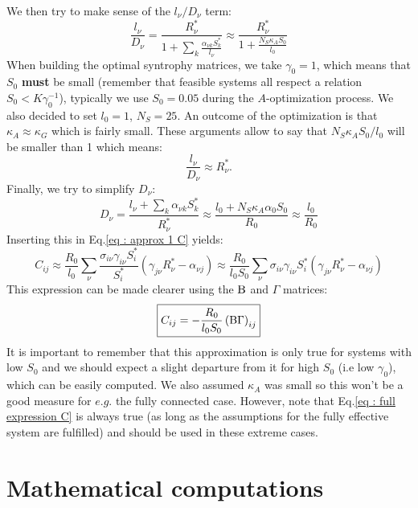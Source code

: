 \documentclass[12pt, titlepage, twoside, openright]{report}
\begin{document}
  We then try to make sense of the $l_\nu / D_\nu $ term:
  \begin{equation}
  \frac{l_\nu}{D_\nu} = \frac{R^*_\nu}{1+\sum_k \frac{\alpha_{\nu k}S^*_k}{l_\nu}} \approx \frac{R^*_\nu}{1+\frac{N_S \kappa_A S_0}{l_0}}
  \end{equation}
  When building the optimal syntrophy matrices, we take $\gamma_0=1$, which means that $S_0$ \textbf{must} be small (remember that feasible systems all respect a relation $S_0 < K \gamma_0^{-1}$), typically we use $S_0 = 0.05$ during the $A$-optimization process. We also decided to set $l_0 = 1$, $N_S=25$. An outcome of the  optimization is that $\kappa_A \approx \kappa_G$ which is fairly small. These arguments allow to say that $N_S \kappa_A S_0/l_0$ will be smaller than 1 which means:
  \begin{equation}
  \frac{l_\nu}{D_\nu} \approx R^*_\nu.
  \end{equation}
  Finally, we try to simplify $D_\nu$:
  \begin{equation}
  D_\nu = \frac{l_\nu + \sum_k \alpha_{\nu k}S^*_k}{R^*_\nu} \approx \frac{l_0+ N_S \kappa_A \alpha_0 S_0}{R_0} \approx \frac{l_0}{R_0}
  \end{equation}
  Inserting this in Eq.\eqref{eq : approx 1 C} yields:
  \begin{equation}
  C_{ij} \approx \frac{R_0}{l_0}\sum_\nu \frac{\sigma_{i\nu}\gamma_{i\nu}S^*_i}{S_i^*}\left(\gamma_{j\nu}R^*_\nu - \alpha_{\nu j}\right) \approx \frac{R_0}{l_0 S_0}\sum_\nu {\sigma_{i\nu}\gamma_{i\nu}S^*_i}\left(\gamma_{j\nu}R^*_\nu - \alpha_{\nu j}\right)
  \end{equation}
  This expression can be made clearer using the $\text{B}$ and $\Gamma$ matrices:
  \begin{equation}
  \boxed{C_{ij} = - \frac{R_0}{l_0 S_0}\left(\text{B} \Gamma\right)_{ij}}
  \end{equation}
  It is important to remember that this approximation is only true for systems with low $S_0$ and we should expect a slight departure from it for high $S_0$ (i.e low $\gamma_0$), which can be easily computed. We also assumed $\kappa_A$ was small so this won't be a good measure for $e.g.$ the fully connected case. However, note that Eq.\eqref{eq : full expression C} is always true (as long as the assumptions for the fully effective system are fulfilled) and should be used in these extreme cases.
  \section{Mathematical computations}
\end{document}
